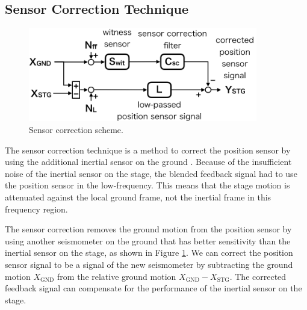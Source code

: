 \subsection{Sensor Correction Technique} \label{sec:sec513}
\begin{figure}[h]
  \begin{center}   
    \includegraphics[width=10cm]{./img_chap5/img505.png}
    \caption{Sensor correction scheme.} \label{img:img505}
  \end{center}
\end{figure}
The sensor correction technique is a method to correct the position sensor by using the additional inertial sensor on the ground \cite{hua2005low}. Because of the insufficient noise of the inertial sensor on the stage, the blended feedback signal had to use the position sensor in the low-frequency. This means that the stage motion is attenuated against the local ground frame, not the inertial frame in this frequency region.

The sensor correction removes the ground motion from the position sensor by using another seismometer on the ground that has better sensitivity than the inertial sensor on the stage, as shown in Figure \ref{img:img505}. We can correct the position sensor signal to be a signal of the new seismometer by subtracting the ground motion $X_{\mathrm{GND}}$ from the relative ground motion $X_{\mathrm{GND}}-X_{\mathrm{STG}}$. The corrected feedback signal can compensate for the performance of the inertial sensor on the stage.

